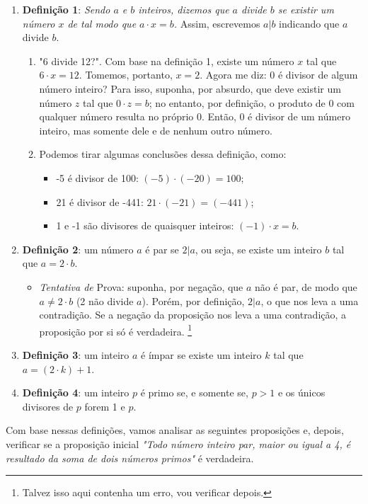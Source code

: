 \documentclass[13pt,letterpaper]{article}
\begin{document}
\begin{enumerate}
    \item \textbf{Definição 1}: \emph{Sendo $a$ e $b$ inteiros, dizemos que $a$ divide $b$ se existir um número $x$ de tal modo que $ a \cdot x = b $.} Assim, escrevemos $a|b$ indicando que $a$ divide $b$.
    \begin{enumerate}
    \item "6 divide 12?". Com base na definição 1, existe um número $x$ tal que $6 \cdot x = 12$. Tomemos, portanto, $x = 2$. Agora me diz: 0 é divisor de algum número inteiro? Para isso, suponha, por absurdo, que deve existir um número $z$ tal que $ 0 \cdot z = b$; no entanto, por definição, o produto de 0 com qualquer número resulta no próprio 0. Então, 0 é divisor de um número inteiro, mas somente dele e de nenhum outro número.
    \item Podemos tirar algumas conclusões dessa definição, como:
    \begin{itemize}
        \item -5 é divisor de 100: $(-5) \cdot (-20) = 100$;
        \item 21 é divisor de -441: $21 \cdot (-21) = (-441)$;
        \item 1 e -1 são divisores de quaisquer inteiros: $(-1) \cdot x = b$.
    \end{itemize}
    \end{enumerate}
    
    \item \textbf{Definição 2}: um número $a$ é par se $2|a$, ou seja, se existe um inteiro $b$ tal que $a = 2 \cdot b$.
    \begin{itemize}
        \item \emph{Tentativa de} Prova: suponha, por negação, que $a$ não é par, de modo que $ a \ne 2 \cdot b$ (2 não divide $a$). Porém, por definição, $2|a$, o que nos leva a uma contradição. Se a negação da proposição nos leva a uma contradição, a proposição por si só é verdadeira.
        \footnote{Talvez isso aqui contenha um erro, vou verificar depois.}
    \end{itemize}
    \item \textbf{Definição 3}: um inteiro $a$ é ímpar se existe um inteiro $k$ tal que $a = (2 \cdot k) + 1$.
    \item \textbf{Definição 4}: um inteiro $p$ é primo se, e somente se, $ p > 1 $ e os únicos divisores de $p$ forem 1 e $p$.
\end{enumerate}

Com base nessas definições, vamos analisar as seguintes proposições e, depois, verificar se a proposição inicial \emph{"Todo número inteiro par, maior ou igual a 4, é resultado da soma de dois números primos"} é verdadeira.
\end{document}
